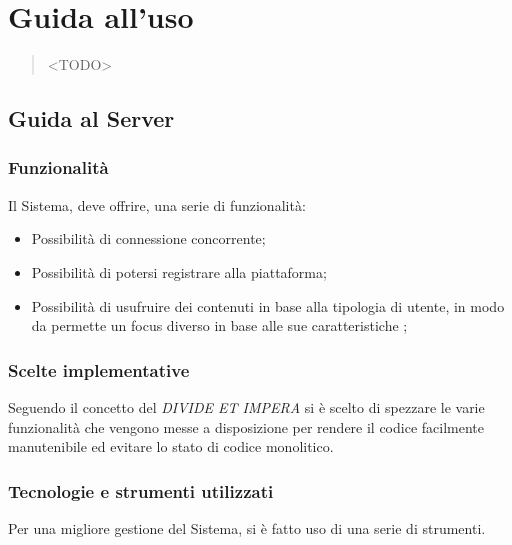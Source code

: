 \chapter{Guida all'uso}
  \begin{abstract}
    <TODO>
  \end{abstract}
  \section{Guida al Server}
    \subsection{Funzionalità}
      Il Sistema, deve offrire, una serie di funzionalità:
      \begin{itemize}
        \item Possibilità di connessione concorrente;
        \item Possibilità di potersi registrare alla piattaforma\footnotemark {};
        \item Possibilità di usufruire dei contenuti in base alla tipologia di utente, in modo da permette un focus diverso in base alle sue caratteristiche\footnotemark {} ;
      \end{itemize}

    \subsection{Scelte implementative}
        Seguendo il concetto del \emph{DIVIDE ET IMPERA}\footnotemark {} si è scelto di spezzare le varie funzionalità che vengono messe a disposizione per rendere il codice facilmente manutenibile ed evitare lo stato di codice monolitico\footnotemark {}.
    \subsection{Tecnologie e strumenti utilizzati}
      Per una migliore gestione del Sistema, si è fatto uso di una serie di strumenti.

